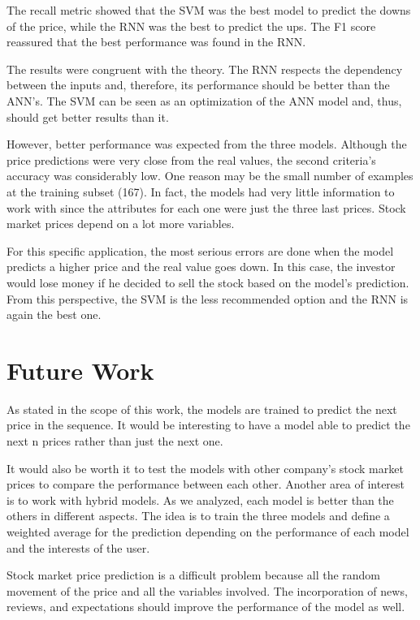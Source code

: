 The recall metric showed that the SVM was the best model to predict the downs of the price, while the RNN was the best to predict the ups. The F1 score reassured that the best performance was found in the RNN.

The results were congruent with the theory. The RNN respects the dependency between the inputs and, therefore, its performance should be better than the ANN's. The SVM can be seen as an optimization of the ANN model and, thus, should get better results than it. 

However, better performance was expected from the three models. Although the price predictions were very close from the real values, the second criteria's accuracy was considerably low. One reason may be the small number of examples at the training subset (167). In fact, the models had very little information to work with since the attributes for each one were just the three last prices. Stock market prices depend on a lot more variables.

For this specific application, the most serious errors are done when the model predicts a higher price and the real value goes down. In this case, the investor would lose money if he decided to sell the stock based on the model's prediction. From this perspective, the SVM is the less recommended option and the RNN is again the best one. 

\section{Future Work}

As stated in the scope of this work, the models are trained to predict the next price in the sequence. It would be interesting to have a model able to predict the next n prices rather than just the next one.

It would also be worth it to test the models with other company's stock market prices to compare the performance between each other. Another area of interest is to work with hybrid models. As we analyzed, each model is better than the others in different aspects. The idea is to train the three models and define a weighted average for the prediction depending on the performance of each model and the interests of the user.

Stock market price prediction is a difficult problem because all the random movement of the price and all the variables involved. The incorporation of news, reviews, and expectations should improve the performance of the model as well. 

